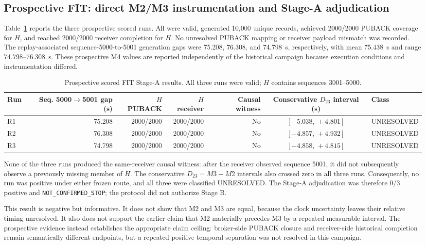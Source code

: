 \documentclass[journal]{IEEEtran}
\begin{document}
\subsection{Prospective FIT: direct M2/M3 instrumentation and Stage-A adjudication}

Table~\ref{tab:stagea} reports the three prospective scored runs. All were valid, generated 10,000 unique records, achieved 2000/2000 PUBACK coverage for $H$, and reached 2000/2000 receiver completion for $H$. No unresolved PUBACK mapping or receiver payload mismatch was recorded. The replay-associated sequence-5000-to-5001 generation gaps were 75.208, 76.308, and 74.798~s, respectively, with mean 75.438~s and range 74.798--76.308~s. These prospective M4 values are reported independently of the historical campaign because execution conditions and instrumentation differed.

\begin{table}[t]
\centering
\caption{Prospective scored FIT Stage-A results. All three runs were valid; $H$ contains sequences 3001--5000.}
\label{tab:stagea}
\begin{tabular}{lrrrrcl}
\toprule
\textbf{Run} &
\textbf{Seq. 5000$\rightarrow$5001 gap (s)} &
\textbf{$H$ PUBACK} &
\textbf{$H$ receiver} &
\textbf{Causal witness} &
\textbf{Conservative $D_{23}$ interval (s)} &
\textbf{Class} \\
\midrule
R1 & 75.208 & 2000/2000 & 2000/2000 & No & $[-5.038,\,+4.801]$ & UNRESOLVED \\
R2 & 76.308 & 2000/2000 & 2000/2000 & No & $[-4.857,\,+4.932]$ & UNRESOLVED \\
R3 & 74.798 & 2000/2000 & 2000/2000 & No & $[-4.858,\,+4.815]$ & UNRESOLVED \\
\bottomrule
\end{tabular}
\end{table}

None of the three runs produced the same-receiver causal witness: after the receiver observed sequence 5001, it did not subsequently observe a previously missing member of $H$. The conservative $D_{23}=M3-M2$ intervals also crossed zero in all three runs. Consequently, no run was positive under either frozen route, and all three were classified UNRESOLVED. The Stage-A adjudication was therefore 0/3 positive and \texttt{NOT\_CONFIRMED\_STOP}; the protocol did not authorize Stage B.

This result is negative but informative. It does not show that M2 and M3 are equal, because the clock uncertainty leaves their relative timing unresolved. It also does not support the earlier claim that M2 materially precedes M3 by a repeated measurable interval. The prospective evidence instead establishes the appropriate claim ceiling: broker-side PUBACK closure and receiver-side historical completion remain semantically different endpoints, but a repeated positive temporal separation was not resolved in this campaign.
\end{document}
